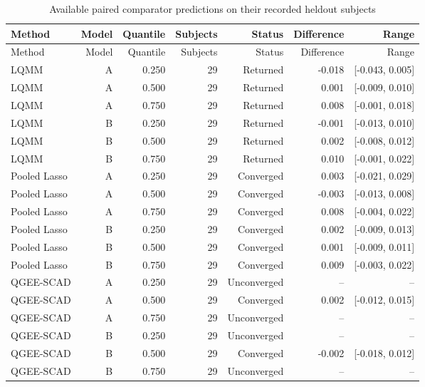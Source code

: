 \begin{longtable}{lrrrrrr}
\caption{Available paired comparator predictions on their recorded heldout subjects}\label{tab:joint-comparators}\\
\toprule
Method & Model & Quantile & Subjects & Status & Difference & Range \\
\midrule\endfirsthead
\toprule
Method & Model & Quantile & Subjects & Status & Difference & Range \\
\midrule\endhead
LQMM & A & 0.250 & 29 & Returned & -0.018 & [-0.043, 0.005] \\
LQMM & A & 0.500 & 29 & Returned & 0.001 & [-0.009, 0.010] \\
LQMM & A & 0.750 & 29 & Returned & 0.008 & [-0.001, 0.018] \\
LQMM & B & 0.250 & 29 & Returned & -0.001 & [-0.013, 0.010] \\
LQMM & B & 0.500 & 29 & Returned & 0.002 & [-0.008, 0.012] \\
LQMM & B & 0.750 & 29 & Returned & 0.010 & [-0.001, 0.022] \\
Pooled Lasso & A & 0.250 & 29 & Converged & 0.003 & [-0.021, 0.029] \\
Pooled Lasso & A & 0.500 & 29 & Converged & -0.003 & [-0.013, 0.008] \\
Pooled Lasso & A & 0.750 & 29 & Converged & 0.008 & [-0.004, 0.022] \\
Pooled Lasso & B & 0.250 & 29 & Converged & 0.002 & [-0.009, 0.013] \\
Pooled Lasso & B & 0.500 & 29 & Converged & 0.001 & [-0.009, 0.011] \\
Pooled Lasso & B & 0.750 & 29 & Converged & 0.009 & [-0.003, 0.022] \\
QGEE-SCAD & A & 0.250 & 29 & Unconverged & -- & -- \\
QGEE-SCAD & A & 0.500 & 29 & Converged & 0.002 & [-0.012, 0.015] \\
QGEE-SCAD & A & 0.750 & 29 & Unconverged & -- & -- \\
QGEE-SCAD & B & 0.250 & 29 & Unconverged & -- & -- \\
QGEE-SCAD & B & 0.500 & 29 & Converged & -0.002 & [-0.018, 0.012] \\
QGEE-SCAD & B & 0.750 & 29 & Unconverged & -- & -- \\
\bottomrule
\end{longtable}
